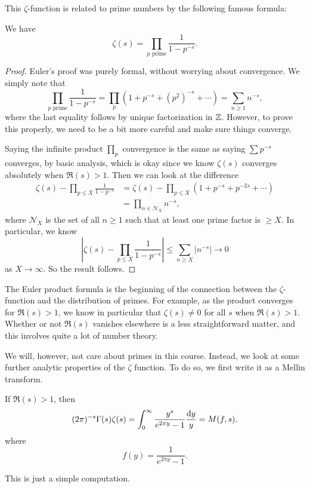 \documentclass[a4paper]{article}
\begin{document}
This $\zeta$-function is related to prime numbers by the following famous formula:
\begin{prop}
  We have
  \[
    \zeta(s) = \prod_{p \text{ prime}} \frac{1}{1 - p^{-s}}.
  \]
\end{prop}

\begin{proof}
  Euler's proof was purely formal, without worrying about convergence. We simply note that
  \[
    \prod_{p\text{ prime}} \frac{1}{1 - p^{-s}} = \prod_p (1 + p^{-s} + (p^2)^{-s} + \cdots) = \sum_{n \geq 1} n^{-s},
  \]
  where the last equality follows by unique factorization in $\mathbb{Z}$. However, to prove this properly, we need to be a bit more careful and make sure things converge.

  Saying the infinite product $\prod_p$ convergence is the same as saying $\sum p^{-s}$ converges, by basic analysis, which is okay since we know $\zeta(s)$ converges absolutely when $\Re(s) > 1$. Then we can look at the difference
  \begin{align*}
    \zeta(s) - \prod_{p \leq X} \frac{1}{1 - p^{-s}} &= \zeta(s) - \prod_{p \leq X} (1 + p^{-s} + p^{-2s} + \cdots)\\
    &= \prod_{n \in \mathcal{N}_X} n^{-s},
  \end{align*}
  where $\mathcal{N}_X$ is the set of all $n \geq 1$ such that at least one prime factor is $\geq X$. In particular, we know
  \[
    \left|\zeta(s) - \prod_{p \leq X} \frac{1}{1 - p^{-s}}\right| \leq \sum_{n \geq X} |n^{-s}| \to 0
  \]
  as $X \to \infty$. So the result follows.
\end{proof}
The Euler product formula is the beginning of the connection between the $\zeta$-function and the distribution of primes. For example, as the product converges for $\Re(s) > 1$, we know in particular that $\zeta(s) \not= 0$ for all $s$ when $\Re(s) > 1$. Whether or not $\Re(s)$ vanishes elsewhere is a less straightforward matter, and this involves quite a lot of number theory.

We will, however, not care about primes in this course. Instead, we look at some further analytic properties of the $\zeta$ function. To do so, we first write it as a Mellin transform.
\begin{thm}
  If $\Re(s) > 1$, then
  \[
    (2\pi)^{-s} \Gamma(s) \zeta(s) = \int_0^\infty \frac{y^s}{e^{2\pi y} - 1} \frac{\mathrm{d} y}{y} = M(f, s),
  \]
  where
  \[
    f(y) = \frac{1}{e^{2 \pi y} - 1}.
  \]
\end{thm}
This is just a simple computation.
\end{document}
